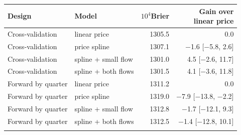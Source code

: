 \begin{tabular}{llrr}
\toprule
Design & Model & $10^4$Brier & \thead{Gain over\\linear price} \\
\midrule
Cross-validation & linear price & 1305.5 & 0.0 \\
Cross-validation & price spline & 1307.1 & \ensuremath{-}1.6 [\ensuremath{-}5.8, 2.6] \\
Cross-validation & spline + small flow & 1301.0 & 4.5 [\ensuremath{-}2.6, 11.7] \\
Cross-validation & spline + both flows & 1301.5 & 4.1 [\ensuremath{-}3.6, 11.8] \\
\addlinespace
Forward by quarter & linear price & 1311.2 & 0.0 \\
Forward by quarter & price spline & 1319.0 & \ensuremath{-}7.9 [\ensuremath{-}13.8, \ensuremath{-}2.2] \\
Forward by quarter & spline + small flow & 1312.8 & \ensuremath{-}1.7 [\ensuremath{-}12.1, 9.3] \\
Forward by quarter & spline + both flows & 1312.5 & \ensuremath{-}1.4 [\ensuremath{-}12.8, 10.1] \\
\addlinespace
\bottomrule
\end{tabular}
